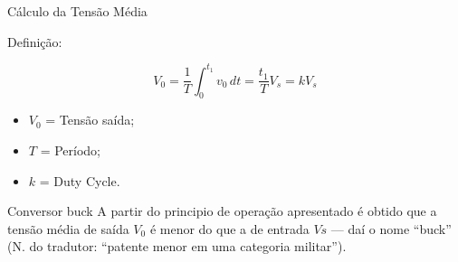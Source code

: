 \documentclass[aspectratio=169]{beamer}
\begin{document}
\begin{frame}{Cálculo da Tensão Média}
  
  \begin{block}{Definição:}

    \[
V_0= \frac{1}{T} \int_{0}^{t_1} v_0 \, dt = \frac{t_1}{T} V_s = k V_s
\]

  \end{block}

  \begin{itemize}
    \item $V_0$ = Tensão saída;
    \item $T$ = Período;
    \item $k$ = Duty Cycle.
\end{itemize}

\end{frame}


\begin{frame}{Conversor buck}
    A partir do principio de operação apresentado é obtido que a tensão média de saída $V_0$ é menor do que a de entrada $Vs$ —   daí o nome “buck” (N. do tradutor: “patente menor em uma categoria militar”).
\end{frame}
\end{document}
